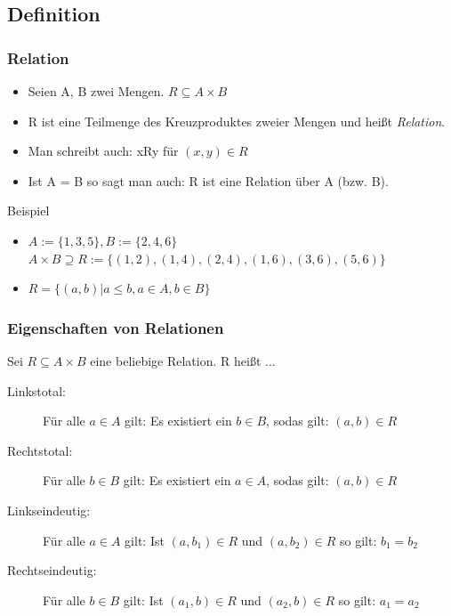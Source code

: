 \documentclass{beamer}
\begin{document}
\subsection{Definition}
\begin{frame}
  \frametitle{Relation}
  \begin{definition}
    \begin{itemize}
      \item Seien A, B zwei Mengen. $ R \subseteq A \times B $
      \item R ist eine Teilmenge des Kreuzproduktes zweier Mengen und heißt \emph{Relation}.
      \item Man schreibt auch: xRy für $(x, y) \in R$
      \item Ist A = B so sagt man auch: R ist eine Relation über A (bzw. B).
    \end{itemize}
  \end{definition} \pause
  \begin{exampleblock}{Beispiel}
    \begin{itemize}
    \item $ A := \{1, 3, 5\}, B := \{2, 4, 6\}$ $A \times B \supseteq R := \{(1, 2), (1, 4), (2, 4), (1, 6), (3, 6), (5, 6)\}$ \pause
    \item $ R = \{(a, b) | a \leq b, a \in A, b \in B \}$
    \end{itemize}
  \end{exampleblock}
\end{frame}
\begin{frame}
  \frametitle{Eigenschaften von Relationen}
  \begin{definition}
      Sei $R \subseteq A \times B$ eine beliebige Relation. R heißt ...
      \begin{description}
        \item[Linkstotal:] Für alle $a \in A$ gilt: Es existiert ein $b \in B$, sodas gilt: $(a, b) \in R$
        \item[Rechtstotal:] Für alle $b \in B$ gilt: Es existiert ein $a \in A$, sodas gilt: $(a, b) \in R$
        \item[Linkseindeutig:] Für alle $a \in A$ gilt: Ist $(a, b_1) \in R$ und $(a, b_2) \in R$ so gilt: $b_1 = b_2$
        \item[Rechtseindeutig:] Für alle $b \in B$ gilt: Ist $(a_1, b) \in R$ und $(a_2, b) \in R$ so gilt: $a_1 = a_2$
      \end{description}
  \end{definition}
\end{frame}
\end{document}
